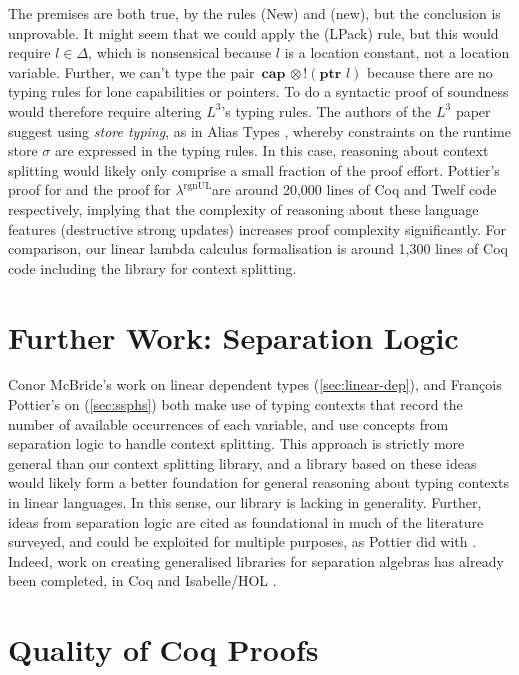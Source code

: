 \documentclass[]{unswthesis}
\newcommand{\rgnUL}{$\lambda^\text{rgnUL}$\text{ }}
\newcommand{\SSPHS}{\text{SSPHS }}
\newcommand{\Francois}{Fran\frenchc{c}ois }
\newcommand{\ptr}[1]{\textbf{ptr $#1$}}
\newcommand{\capa}[1]{\textbf{cap $#1$}}
\let\frenchc\c
\let\c\texttt
\let\i\textit
\begin{document}
The premises are both true, by the rules (New) and (new), but the conclusion is unprovable. It might seem that we could apply the (LPack) rule, but this would require $l \in \Delta$, which is nonsensical because $l$ is a location constant, not a location variable. Further, we can't type the pair $\capa \otimes !(\ptr{l})$ because there are no typing rules for lone capabilities or pointers. To do a syntactic proof of soundness would therefore require altering $L^3$'s typing rules. The authors of the $L^3$ paper suggest using \i{store typing}, as in Alias Types \cite{smith00}, whereby constraints on the runtime store $\sigma$ are expressed in the typing rules. In this case, reasoning about context splitting would likely only comprise a small fraction of the proof effort. Pottier's proof for \SSPHS and the proof for \rgnUL are around 20,000 lines of Coq and Twelf code respectively, implying that the complexity of reasoning about these language features (destructive strong updates) increases proof complexity significantly. For comparison, our linear lambda calculus formalisation is around 1,300 lines of Coq code including the library for context splitting.

\section{Further Work: Separation Logic}
\label{sec:sep-logic}

Conor McBride's work on linear dependent types (\cref{sec:linear-dep}), and \Francois Pottier's on \SSPHS (\cref{sec:ssphs}) both make use of typing contexts that record the number of available occurrences of each variable, and use concepts from separation logic to handle context splitting. This approach is strictly more general than our context splitting library, and a library based on these ideas would likely form a better foundation for general reasoning about typing contexts in linear languages. In this sense, our library is lacking in generality. Further, ideas from separation logic are cited as foundational in much of the literature surveyed, and could be exploited for multiple purposes, as Pottier did with \SSPHS \cite{pottier13}. Indeed, work on creating generalised libraries for separation algebras has already been completed, in Coq \cite{dockins09} and Isabelle/HOL \cite{klein12}.

\section{Quality of Coq Proofs}
\end{document}
